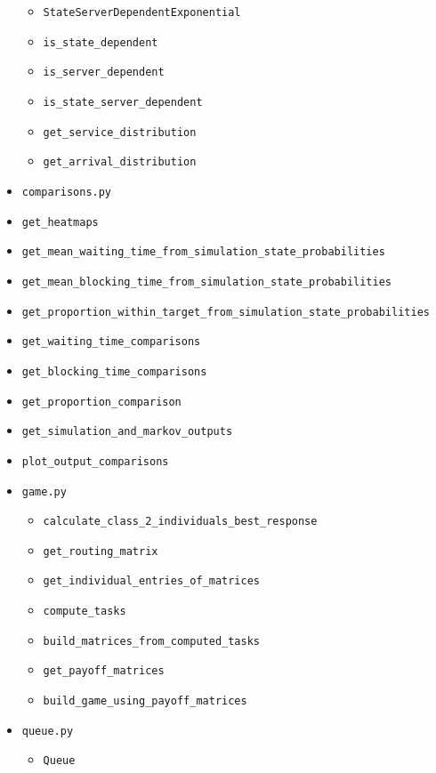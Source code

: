 \begin{itemize}
\begin{itemize}
        \item \texttt{StateServerDependentExponential}
        \item \texttt{is\_state\_dependent}
        \item \texttt{is\_server\_dependent}
        \item \texttt{is\_state\_server\_dependent}
        \item \texttt{get\_service\_distribution}
        \item \texttt{get\_arrival\_distribution}
    \end{itemize}
    \item \texttt{comparisons.py}
        \item \texttt{get\_heatmaps}
        \item \texttt{get\_mean\_waiting\_time\_from\_simulation\_state\_probabilities}
        \item \texttt{get\_mean\_blocking\_time\_from\_simulation\_state\_probabilities}
        \item \texttt{get\_proportion\_within\_target\_from\_simulation\_state\_probabilities}
        \item \texttt{get\_waiting\_time\_comparisons}
        \item \texttt{get\_blocking\_time\_comparisons}
        \item \texttt{get\_proportion\_comparison}
        \item \texttt{get\_simulation\_and\_markov\_outputs}
        \item \texttt{plot\_output\_comparisons}
    \item \texttt{game.py}
    \begin{itemize}
        \item \texttt{calculate\_class\_2\_individuals\_best\_response}
        \item \texttt{get\_routing\_matrix}
        \item \texttt{get\_individual\_entries\_of\_matrices}
        \item \texttt{compute\_tasks}
        \item \texttt{build\_matrices\_from\_computed\_tasks}
        \item \texttt{get\_payoff\_matrices}
        \item \texttt{build\_game\_using\_payoff\_matrices}
    \end{itemize}
    \item \texttt{queue.py}
    \begin{itemize}
        \item \texttt{Queue}
    \end{itemize}
\end{itemize}
\normalsize
